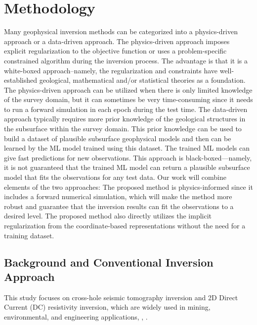 \documentclass[lettersize,journal]{IEEEtran}
\begin{document}
\section{Methodology}
\label{sec:2}
Many geophysical inversion methods can be categorized into a physics-driven approach or a data-driven approach. The physics-driven approach imposes explicit regularization to the objective function or uses a problem-specific constrained algorithm during the inversion process. The advantage is that it is a white-boxed approach--namely, the regularization and constraints have well-established geological, mathematical and/or statistical theories as a foundation. The physics-driven approach can be utilized when there is only limited knowledge of the survey domain, but it can sometimes be very time-consuming since it needs to run a forward simulation in each epoch during the test time. The data-driven approach typically requires more prior knowledge of the geological structures in the subsurface within the survey domain. This prior knowledge can be used to build a dataset of plausible subsurface geophysical models and then can be learned by the ML model trained using this dataset. The trained ML models can give fast predictions for new observations. This approach is black-boxed---namely, it is not guaranteed that the trained ML model can return a plausible subsurface model that fits the observations for any test data. Our work will combine elements of the two approaches: The proposed method is physics-informed since it includes a forward numerical simulation, which will make the method more robust and guarantee that the inversion results can fit the observations to a desired level. The proposed method also directly utilizes the implicit regularization from the coordinate-based representations without the need for a training dataset.

\subsection{Background and Conventional Inversion Approach}

This study focuses on cross-hole seismic tomography inversion and 2D Direct Current (DC) resistivity inversion, which are widely used in mining, environmental, and engineering applications\cite{sharma_inversion_2015}, \cite{wei_quantifying_2022}, \cite{melo_geophysical_2017}. 
\end{document}

